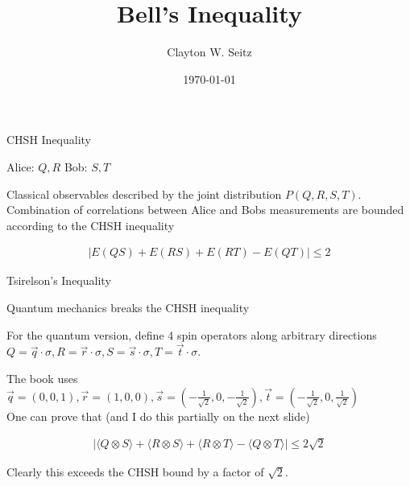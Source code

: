 \documentclass[aspectratio=1610]{beamer}					%
\title{Bell's Inequality}	%
\author{Clayton W. Seitz}								%
\date{\today}									%
\begin{document}
\begin{frame}
  \titlepage
\end{frame}

\begin{frame}{CHSH Inequality}

\vspace{0.2in}

Alice: $Q,R$
Bob: $S, T$

\vspace{0.1in}
Classical observables described by the joint distribution $P(Q,R,S,T)$. Combination of correlations between Alice and Bobs measurements are bounded according to the CHSH inequality

\begin{align*}
|E(QS) + E(RS) + E(RT) - E(QT)| \leq 2
\end{align*}

\end{frame}

\begin{frame}{Tsirelson's Inequality}

Quantum mechanics breaks the CHSH inequality\\
\vspace{0.2in}

For the quantum version, define 4 spin operators along arbitrary directions $Q = \vec{q}\cdot\sigma, R = \vec{r}\cdot\sigma, S = \vec{s}\cdot\sigma, T = \vec{t}\cdot\sigma$.

The book uses $\vec{q} = (0,0,1), \vec{r} = (1,0,0), \vec{s} = (-\frac{1}{\sqrt{2}},0,-\frac{1}{\sqrt{2}}), \vec{t} = (-\frac{1}{\sqrt{2}},0,\frac{1}{\sqrt{2}})$\\

\vspace{0.2in}
One can prove that (and I do this partially on the next slide)

\begin{align*}
|\langle Q\otimes S\rangle + \langle R\otimes S\rangle  + \langle R\otimes T\rangle  - \langle Q\otimes T\rangle|  \leq 2\sqrt{2}
\end{align*}

Clearly this exceeds the CHSH bound by a factor of $\sqrt{2}$.

\end{frame}
\end{document}
